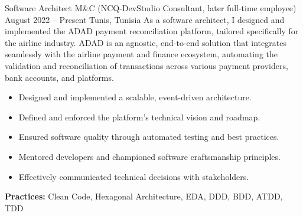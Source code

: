 \documentclass[10pt,a4paper]{resume-settings}
\begin{document}

\begin{fullwidth}
\makecvheader
\end{fullwidth}



\cvevent
    {Software Architect}
    {M\&C (NCQ-DevStudio Consultant, later full-time employee)}
    {August 2022 -- Present}
    {Tunis, Tunisia}
    {As a software architect, I designed and implemented the ADAD payment reconciliation platform, tailored specifically for the airline industry. ADAD is an agnostic, end-to-end solution that integrates seamlessly with the airline payment and finance ecosystem, automating the validation and reconciliation of transactions across various payment providers, bank accounts, and platforms.}

    \begin{itemize}
        \item Designed and implemented a scalable, event-driven architecture.
        \item Defined and enforced the platform's technical vision and roadmap.
        \item Ensured software quality through automated testing and best practices.
        \item Mentored developers and championed software craftsmanship principles.
        \item Effectively communicated technical decisions with stakeholders.
    \end{itemize}

    \textbf{Practices:} Clean Code, Hexagonal Architecture, EDA, DDD, BDD, ATDD, TDD  
    
\end{document}
